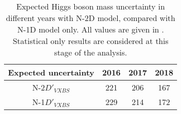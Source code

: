 \begin{table}[ht]	
\begin{center}
\begin{tabular}{|c|ccc|}
\hline			
Expected uncertainty	&	2016	&	2017	&	2018	\\
\hline			
N-2$D'_{VXBS}$	&	221	&	206	&	167	\\
N-1$D'_{VXBS}$	&	229	&	214	&	172	\\
\hline
\end{tabular}
\end{center}
\caption{Expected Higgs boson mass uncertainty in different years 
	with N-2D model, compared with N-1D model only.
	All values are given in \MeV.  
Statistical only results are considered at this stage of the analysis.}
\label{table:N2D_model_result_year}
\end{table}
